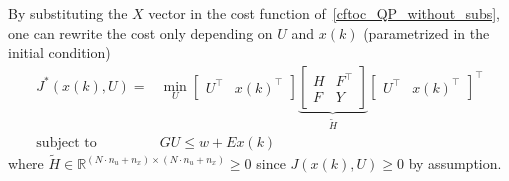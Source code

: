 By substituting the $X$ vector in the cost function of~\ref{cftoc_QP_without_subs}, one can rewrite the cost only depending on $U$ and $x(k)$ (parametrized in the initial condition)
\begin{align*}
    J^*(x(k), U)=          & \min_{U}\begin{bmatrix}
                                         U^\top & {x(k)}^\top
                                     \end{bmatrix}
    \underbrace{\begin{bmatrix}
                        H & F^\top \\
                        F & Y
                    \end{bmatrix}}_{\widetilde{H}}
    {\begin{bmatrix}
         U^\top & {x(k)}^\top
     \end{bmatrix}}^\top                                 \\
    \text{subject to}\quad & GU \leq w + Ex(k)
\end{align*}
where $\widetilde{H}\in \mathbb{R}^{(N\cdot n_u + n_x)\times (N\cdot n_u + n_x)}\geq 0$ since $J(x(k),U) \geq 0$ by assumption.

\newpar{}

